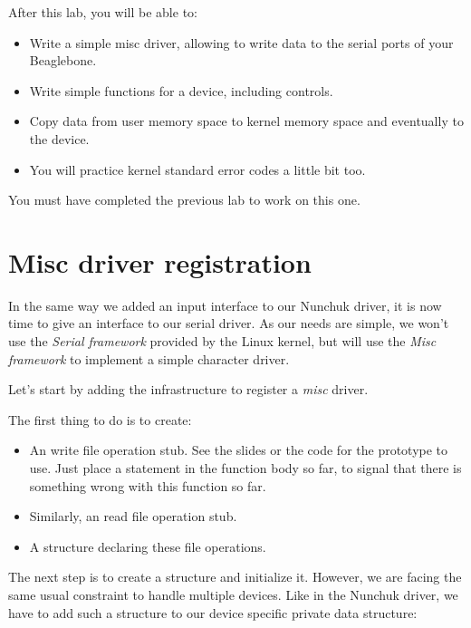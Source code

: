 
After this lab, you will be able to:

\begin{itemize}
\item Write a simple misc driver, allowing to write data to the
  serial ports of your Beaglebone.
\item Write simple  functions for a device,
  including  controls.
\item Copy data from user memory space to kernel memory space and
  eventually to the device.
\item You will practice kernel standard error codes a little bit too.
\end{itemize}

You must have completed the previous lab to work on this one.

\section{Misc driver registration}

In the same way we added an input interface to our Nunchuk driver, it is
now time to give an interface to our serial driver. As our needs are
simple, we won't use the {\em Serial framework} provided by the Linux
kernel, but will use the {\em Misc framework} to implement a simple
character driver.

Let's start by adding the infrastructure to register a {\em misc}
driver.

The first thing to do is to create:

\begin{itemize}
\item An  write file operation stub.
      See the slides or the code for the prototype to use.
      Just place a  statement in the function
      body so far, to signal that there is something wrong with this
      function so far.
\item Similarly, an  read file operation stub.
\item A  structure declaring these file
      operations.
\end{itemize}

The next step is to create a  structure and initialize
it. However, we are facing the same usual constraint to handle multiple
devices. Like in the Nunchuk driver, we have to add such a structure
to our device specific private data structure:


